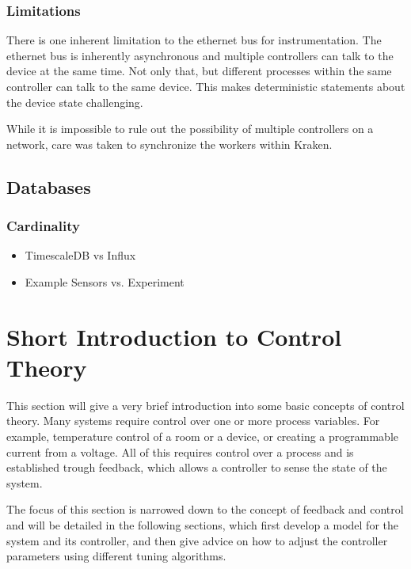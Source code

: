 \subsubsection{Limitations} %
There is one inherent limitation to the ethernet bus for instrumentation. The ethernet bus is inherently asynchronous and multiple controllers can talk to the device at the same time. Not only that, but different processes within the same controller can talk to the same device. This makes deterministic statements about the device state challenging.

While it is impossible to rule out the possibility of multiple controllers on a network, care was taken to synchronize the workers within Kraken.
\subsection{Databases}
\subsubsection{Cardinality}
\begin{itemize}
 \item TimescaleDB vs Influx
 \item Example Sensors vs. Experiment
\end{itemize}

\clearpage
\section{Short Introduction to Control Theory}
This section will give a very brief introduction into some basic concepts of control theory. Many systems require control over one or more process variables. For example, temperature control of a room or a device, or creating a programmable current from a voltage. All of this requires control over a process and is established trough feedback, which allows a controller to sense the state of the system.

The focus of this section is narrowed down to the concept of feedback and control and will be detailed in the following sections, which first develop a model for the system and its controller, and then give advice on how to adjust the controller parameters using different tuning algorithms.

